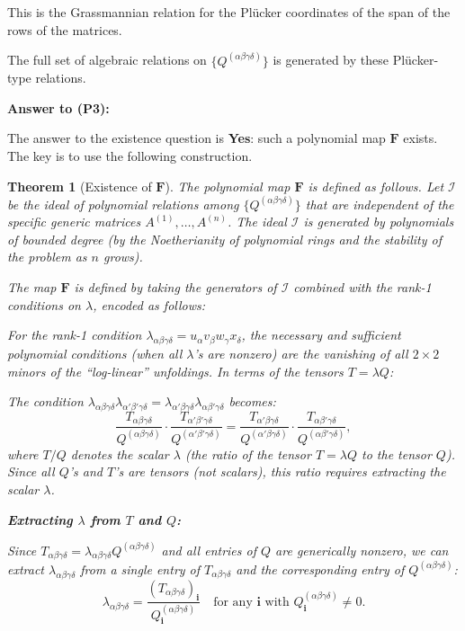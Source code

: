 \documentclass[12pt]{article}
\newtheorem{theorem}{Theorem}
\begin{document}
This is the Grassmannian relation for the Plücker coordinates of the span of the rows of the matrices.

The full set of algebraic relations on $\{Q^{(\alpha\beta\gamma\delta)}\}$ is generated by these Plücker-type relations.

\textbf{Answer to (P3):}

The answer to the existence question is \textbf{Yes}: such a polynomial map $\mathbf{F}$ exists. The key is to use the following construction.

\begin{theorem}[Existence of $\mathbf{F}$]\label{thm:existence}
The polynomial map $\mathbf{F}$ is defined as follows. Let $\mathcal{I}$ be the ideal of polynomial relations among $\{Q^{(\alpha\beta\gamma\delta)}\}$ that are independent of the specific generic matrices $A^{(1)}, \ldots, A^{(n)}$. The ideal $\mathcal{I}$ is generated by polynomials of bounded degree (by the Noetherianity of polynomial rings and the stability of the problem as $n$ grows).

The map $\mathbf{F}$ is defined by taking the generators of $\mathcal{I}$ combined with the rank-1 conditions on $\lambda$, encoded as follows:

For the rank-1 condition $\lambda_{\alpha\beta\gamma\delta} = u_\alpha v_\beta w_\gamma x_\delta$, the necessary and sufficient polynomial conditions (when all $\lambda$'s are nonzero) are the vanishing of all $2\times 2$ minors of the ``log-linear'' unfoldings. In terms of the tensors $T = \lambda Q$:

The condition $\lambda_{\alpha\beta\gamma\delta}\lambda_{\alpha'\beta'\gamma\delta} = \lambda_{\alpha'\beta\gamma\delta}\lambda_{\alpha\beta'\gamma\delta}$ becomes:
\[
\frac{T_{\alpha\beta\gamma\delta}}{Q^{(\alpha\beta\gamma\delta)}} \cdot \frac{T_{\alpha'\beta'\gamma\delta}}{Q^{(\alpha'\beta'\gamma\delta)}} = \frac{T_{\alpha'\beta\gamma\delta}}{Q^{(\alpha'\beta\gamma\delta)}} \cdot \frac{T_{\alpha\beta'\gamma\delta}}{Q^{(\alpha\beta'\gamma\delta)}},
\]
where $T/Q$ denotes the scalar $\lambda$ (the ratio of the tensor $T = \lambda Q$ to the tensor $Q$). Since all $Q$'s and $T$'s are tensors (not scalars), this ratio requires extracting the scalar $\lambda$.

\textbf{Extracting $\lambda$ from $T$ and $Q$:}

Since $T_{\alpha\beta\gamma\delta} = \lambda_{\alpha\beta\gamma\delta} Q^{(\alpha\beta\gamma\delta)}$ and all entries of $Q$ are generically nonzero, we can extract $\lambda_{\alpha\beta\gamma\delta}$ from a single entry of $T_{\alpha\beta\gamma\delta}$ and the corresponding entry of $Q^{(\alpha\beta\gamma\delta)}$:
\[
\lambda_{\alpha\beta\gamma\delta} = \frac{(T_{\alpha\beta\gamma\delta})_\mathbf{i}}{Q^{(\alpha\beta\gamma\delta)}_\mathbf{i}} \quad \text{for any } \mathbf{i} \text{ with } Q^{(\alpha\beta\gamma\delta)}_\mathbf{i} \neq 0.
\]


\end{theorem}
\end{document}
